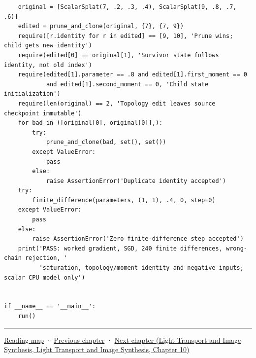 \begin{verbatim}
    original = [ScalarSplat(7, .2, .3, .4), ScalarSplat(9, .8, .7, .6)]
    edited = prune_and_clone(original, {7}, {7, 9})
    require([r.identity for r in edited] == [9, 10], 'Prune wins; child gets new identity')
    require(edited[0] == original[1], 'Survivor state follows identity, not old index')
    require(edited[1].parameter == .8 and edited[1].first_moment == 0
            and edited[1].second_moment == 0, 'Child state initialization')
    require(len(original) == 2, 'Topology edit leaves source checkpoint immutable')
    for bad in ([original[0], original[0]],):
        try:
            prune_and_clone(bad, set(), set())
        except ValueError:
            pass
        else:
            raise AssertionError('Duplicate identity accepted')
    try:
        finite_difference(parameters, (1, 1), .4, 0, step=0)
    except ValueError:
        pass
    else:
        raise AssertionError('Zero finite-difference step accepted')
    print('PASS: worked gradient, SGD, 240 finite differences, wrong-chain rejection, '
          'saturation, topology/moment identity and negative inputs; scalar CPU model only')


if __name__ == '__main__':
    run()
\end{verbatim}

\begin{center}\rule{0.5\linewidth}{0.5pt}\end{center}

\hyperref[volume-reading-map]{Reading map} · \hyperref[04-visual-computing-ii-ch038-projecting-ellipsoids-into-screen-space-conics]{Previous chapter} · \href{../04-Light-Transport-and-Image-Synthesis/main.pdf\#nameddest=04-visual-computing-ii-ch040-lighting-reconstruction-and-surface-motion}{Next chapter (Light Transport and Image Synthesis, Light Transport and Image Synthesis, Chapter 10)}
